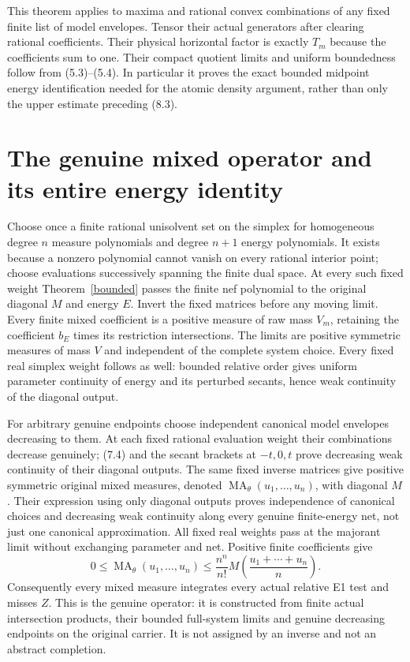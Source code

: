 \documentclass[10pt]{article}
\newcommand{\MA}{\operatorname{MA}}
\begin{document}
This theorem applies to maxima and rational convex combinations of any
fixed finite list of model envelopes. Tensor their actual generators
after clearing rational coefficients. Their physical horizontal factor
is exactly $T_m$ because the coefficients sum to one. Their compact
quotient limits and uniform boundedness follow from (5.3)--(5.4).
In particular it proves the exact bounded midpoint energy identification
needed for the atomic density argument, rather than only the upper estimate preceding (8.3).

\section{The genuine mixed operator and its entire energy identity}
Choose once a finite rational unisolvent set on the simplex for homogeneous
degree $n$ measure polynomials and degree $n+1$ energy polynomials.
It exists because a nonzero polynomial cannot vanish on every rational
interior point; choose evaluations successively spanning the finite
dual space. At every such fixed weight Theorem~\ref{bounded} passes
the finite nef polynomial to the original diagonal $M$ and energy $E$.
Invert the fixed matrices before any moving limit. Every finite mixed
coefficient is a positive measure of raw mass $V_m$, retaining the
coefficient $b_E$ times its restriction intersections. The limits are
positive symmetric measures of mass $V$ and independent of the complete
system choice. Every fixed real simplex weight follows as well: bounded
relative order gives uniform parameter continuity of energy and its
perturbed secants, hence weak continuity of the diagonal output.

For arbitrary genuine endpoints choose independent canonical model
envelopes decreasing to them. At each fixed rational evaluation weight
their combinations decrease genuinely; (7.4) and the secant brackets at
$-t,0,t$ prove decreasing weak continuity of their diagonal outputs.
The same fixed inverse matrices give positive symmetric original mixed
measures, denoted $\MA_\theta(u_1,\ldots,u_n)$, with diagonal $M$.
Their expression using only diagonal outputs proves independence of
canonical choices and decreasing weak continuity along every genuine
finite-energy net, not just one canonical approximation. All fixed real
weights pass at the majorant limit without exchanging parameter and net.
Positive finite coefficients give
\[
 0\leq\MA_\theta(u_1,\ldots,u_n)
 \leq \frac{n^n}{n!}M\left(\frac{u_1+\cdots+u_n}{n}\right).
 \tag{10.1}
\]
Consequently every mixed measure integrates every actual relative E1
test and misses $Z$. This is the genuine operator: it is constructed
from finite actual intersection products, their bounded full-system
limits and genuine decreasing endpoints on the original carrier. It is
not assigned by an inverse and not an abstract completion.
\end{document}
